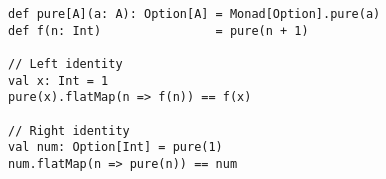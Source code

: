 \begin{algorithm}

\begin{verbatim}
def pure[A](a: A): Option[A] = Monad[Option].pure(a)
def f(n: Int)                = pure(n + 1)

// Left identity
val x: Int = 1
pure(x).flatMap(n => f(n)) == f(x)

// Right identity
val num: Option[Int] = pure(1)
num.flatMap(n => pure(n)) == num
\end{verbatim}

\caption{Monad identity laws in Scala. %
\label{monad:laws:identity}}
\end{algorithm}